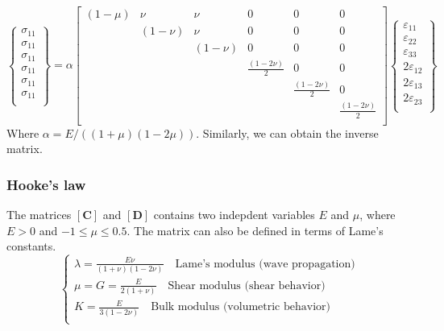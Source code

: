 \documentclass[notes]{beamer}
\begin{document}
\begin{frame}
\begin{equation*}
	\begin{Bmatrix}
		\sigma_{11}\\
		\sigma_{11}\\
		\sigma_{11}\\
		\sigma_{11}\\
		\sigma_{11}\\
		\sigma_{11}\\
	\end{Bmatrix} = \alpha
	\begin{bmatrix}
		(1-\mu) & \nu & \nu & 0 & 0 & 0 \\
	   			& (1-\nu) & \nu & 0 & 0 & 0 \\
	   			&  & (1-\nu) & 0 & 0 & 0 \\
	   			&  & & \frac{(1-2\nu)}{2} & 0 & 0 \\
	   			&  & & & \frac{(1-2\nu)}{2}  & 0 \\
	   			&  & & & & \frac{(1-2\nu)}{2} \\
	\end{bmatrix}
	\begin{Bmatrix}
		\varepsilon_{11}\\
		\varepsilon_{22}\\
		\varepsilon_{33}\\
		2\varepsilon_{12}\\
		2\varepsilon_{13}\\
		2\varepsilon_{23}\\
	\end{Bmatrix}
\end{equation*}
Where $\alpha = E / ((1+\mu)(1-2\mu))$.
Similarly, we can obtain the inverse matrix.
\end{frame}


\begin{frame}
\frametitle{Hooke's law}
The matrices $[\mathbf{C}]$ and $[\mathbf{D}]$ contains two indepdent variables $E$ and $\mu$, where $E > 0$ and $-1 \le \mu \le 0.5$. 
The matrix can also be defined in terms of Lame's constants.
\begin{equation*}
	\begin{cases}
		\lambda = \frac{E \nu}{(1+\nu)(1-2\nu)} \quad \text{Lame's modulus (wave propagation)}\\
		\mu = G = \frac{E}{2(1+\nu)}
		\quad \text{Shear modulus (shear behavior)}\\
		K = \frac{E}{3(1-2\nu)}
		\quad \text{Bulk modulus (volumetric behavior)}\\
	\end{cases}
\end{equation*}
\end{frame}
\end{document}
